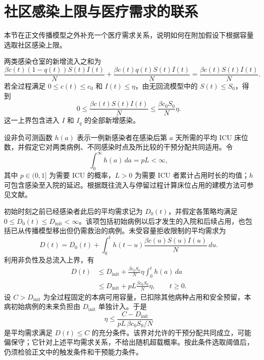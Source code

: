 \section{社区感染上限与医疗需求的联系}
\label{sec:sup:medical-link}
本节在正文传播模型之外补充一个医疗需求关系，说明如何在附加假设下根据容量选取社区感染上限。

两类感染仓室的新增流入之和为
\[
\frac{\beta c(t)(1-q(t))S(t)I(t)}{N}
+\frac{\beta c(t)q(t)S(t)I(t)}{N}
=\frac{\beta c(t)S(t)I(t)}{N}.
\]
若全过程满足 $0\le c(t)\le c_0$ 和 $I(t)\le\eta$，由无回流模型中的 $S(t)\le S_0$，得到
\[
0\le\frac{\beta c(t)S(t)I(t)}{N}
\le\frac{\beta c_0S_0}{N}\eta.
\]
这一上界包含进入 $I$ 和 $I_q$ 的全部新增感染。

设非负可测函数 $h(a)$ 表示一例新感染者在感染后第 $a$ 天所需的平均 ICU 床位数，并假定它对两类病例、不同感染时点及所比较的干预分配共同适用。令
\[
\int_0^\infty h(a)\,da=pL<\infty,
\]
其中 $p\in(0,1]$ 为需要 ICU 的概率，$L>0$ 为需要 ICU 者累计占用时长的均值；$h$ 可包含感染至入院的延迟。根据既往流入与停留过程计算床位占用的建模方法可参见文献\cite{Baas2021Occupancy}。

初始时刻之前已经感染者此后的平均需求记为 $D_0(t)$，并假定各策略均满足 $0\le D_0(t)\le D_{\mathrm{init}}<\infty$。该项包括初始病例以后才发生的入院和后续占用，也包括已从传播模型移出但仍需救治的病例。未受容量拒收限制的平均需求为
\[
D(t)=D_0(t)+\int_0^t h(t-u)
\frac{\beta c(u)S(u)I(u)}{N}\,du.
\]
利用非负性及总流入上界，有
\[
\begin{aligned}
D(t)
&\le D_{\mathrm{init}}+
\frac{\beta c_0S_0}{N}\eta\int_0^t h(a)\,da\\
&\le D_{\mathrm{init}}+pL\frac{\beta c_0S_0}{N}\eta,
\qquad t\ge0.
\end{aligned}
\]
设 $C>D_{\mathrm{init}}$ 为全过程固定的本病可用容量，已扣除其他病种占用和安全预留，本病初始病例的未来负担由 $D_{\mathrm{init}}$ 单独计入。于是
\[
\eta\le\frac{C-D_{\mathrm{init}}}{pL\,\beta c_0S_0/N}
\]
是平均需求满足 $D(t)\le C$ 的充分条件。该界对允许的干预分配共同成立，可能偏保守；它针对上述平均需求关系，不给出随机超载概率。按此条件选取阈值后，仍须检验正文中的触发条件和干预能力条件。


